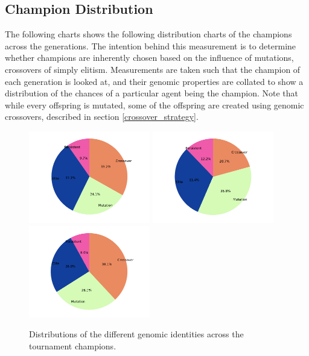 \documentclass[12pt,a4paper]{article}
\begin{document}
    \subsection{Champion Distribution}
        The following charts shows the following distribution charts of the champions across the generations. %
        The intention behind this measurement is to determine whether champions are inherently chosen based on the influence of mutations, crossovers of simply elitism.  Measurements are taken such that the champion of each generation is looked at, and their genomic properties are collated to show a distribution of the chances of a particular agent being the champion. Note that while every offspring is mutated, some of the offspring are created using genomic crossovers, described in section \ref{crossover_strategy}. 

        \begin{figure}[!ht]
            \centering
            \includegraphics[width=53mm]{images/results/1ply/champ_gen_dist.pdf}
            \includegraphics[width=53mm]{images/results/3ply/champ_gen_dist.pdf}
            \includegraphics[width=53mm]{images/results/6ply/champ_gen_dist.pdf}
            \caption{Distributions of the different genomic identities across the tournament champions. \label{champ_gen_dist}}
        \end{figure}
\end{document}
